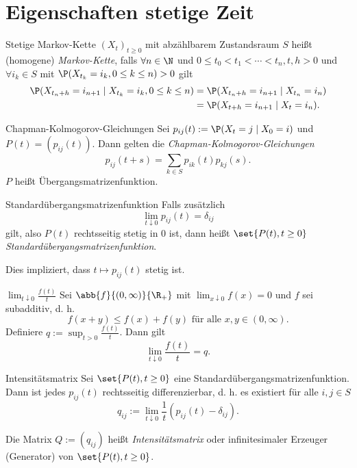 \section{Eigenschaften stetige Zeit}

\begin{karte}{Stetige Markov-Kette}
    \((X_t)_{t\geq 0}\) mit abzählbarem Zustandsraum \(S\) heißt (homogene) 
    \textit{Markov-Kette}, falls \(\forall n\in\N\) und \(0\leq t_0<t_1<\cdots<t_n, t,h>0\) 
    und \(\forall i_k \in S\) mit \( \P(X_{t_k} = i_k, 0 \leq k \leq n)>0 \) gilt 
    \begin{align*}
        \P(X_{t_n+h} = i_{n+1} \;|\; X_{t_k} = i_k, 0\leq k\leq n) &= \P(X_{t_n+h} = i_{n+1} \;|\; X_{t_n} = i_n) \\
        &= \P(X_{t+h} = i_{n+1} \;|\; X_t = i_n).
    \end{align*}
\end{karte}

\begin{karte}{Chapman-Kolmogorov-Gleichungen}
    Sei \( p_{ij}(t) := \P(X_t = j \;|\; X_0 = i) \) und \(P(t) = (p_{ij}(t))\).
    Dann gelten die \textit{Chapman-Kolmogorov-Gleichungen}
    \[ p_{ij}(t+s) = \sum_{k\in S} p_{ik}(t) p_{kj}(s). \]
    \(P\) heißt Übergangsmatrizenfunktion.
\end{karte}

\begin{karte}{Standardübergangsmatrizenfunktion}
    Falls zusätzlich 
    \[ \lim_{t\downarrow 0} p_{ij}(t) = \delta_{ij} \]
    gilt, also \(P(t)\) rechtsseitig stetig in \(0\) ist, dann 
    heißt \( \set{P(t), t\geq 0} \) \textit{Standardübergangsmatrizenfunktion}.

    Dies impliziert, dass \(t\mapsto p_{ij}(t)\) stetig ist.
\end{karte}

\begin{karte}{\( \lim_{t\downarrow 0} \frac{f(t)}{t} \)}
    Sei \( \abb{f}{(0,\infty)}{\R_+} \) mit \(\lim_{x\downarrow 0} f(x) = 0\) 
    und \(f\) sei subadditiv, d. h. 
    \[ f(x+y) \leq f(x) + f(y) \text{ für alle } x,y\in (0,\infty). \]
    Definiere \(q:= \sup_{t> 0} \frac{f(t)}{t}\). Dann gilt 
    \[ \lim_{t\downarrow 0} \frac{f(t)}{t} = q. \]
\end{karte}

\begin{karte}{Intensitätsmatrix}
    Sei \( \set{P(t), t\geq 0} \) eine Standardübergangsmatrizenfunktion. 
    Dann ist jedes \( p_{ij}(t) \) rechtsseitig differenzierbar, d. h. es 
    existiert für alle \(i,j\in S\)
    \[ q_{ij} := \lim_{t\downarrow 0} \frac{1}{t} (p_{ij}(t) - \delta_{ij}). \]

    Die Matrix \(Q := (q_{ij})\) heißt \textit{Intensitätsmatrix} 
    oder infinitesimaler Erzeuger (Generator) von \( \set{P(t), t\geq 0} \).
\end{karte}

